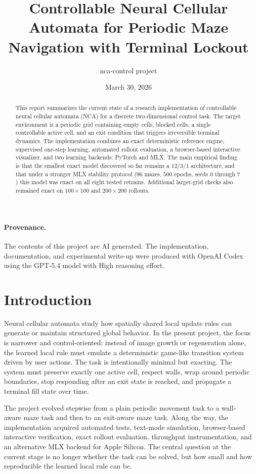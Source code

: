 \documentclass[11pt]{article}
\title{Controllable Neural Cellular Automata for Periodic Maze Navigation with Terminal Lockout}
\author{nca-control project}
\date{March 30, 2026}
\begin{document}
\maketitle

\begin{abstract}
This report summarizes the current state of a research implementation of controllable neural cellular automata (NCA) for a discrete two-dimensional control task. The target environment is a periodic grid containing empty cells, blocked cells, a single controllable active cell, and an exit condition that triggers irreversible terminal dynamics. The implementation combines an exact deterministic reference engine, supervised one-step learning, automated rollout evaluation, a browser-based interactive visualizer, and two learning backends: PyTorch and MLX. The main empirical finding is that the smallest exact model discovered so far remains a \(12/3/1\) architecture, and that under a stronger MLX stability protocol (\(96\) mazes, \(500\) epochs, seeds \(0\) through \(7\)) this model was exact on all eight tested retrains. Additional larger-grid checks also remained exact on \(100\times 100\) and \(200\times 200\) rollouts.
\end{abstract}

\paragraph{Provenance.}
The contents of this project are AI generated. The implementation, documentation, and experimental write-up were produced with OpenAI Codex using the GPT-5.4 model with High reasoning effort.

\section{Introduction}
Neural cellular automata study how spatially shared local update rules can generate or maintain structured global behavior. In the present project, the focus is narrower and control-oriented: instead of image growth or regeneration alone, the learned local rule must emulate a deterministic game-like transition system driven by user actions. The task is intentionally minimal but exacting. The system must preserve exactly one active cell, respect walls, wrap around periodic boundaries, stop responding after an exit state is reached, and propagate a terminal fill state over time.

The project evolved stepwise from a plain periodic movement task to a wall-aware maze task and then to an exit-aware maze task. Along the way, the implementation acquired automated tests, text-mode simulation, browser-based interactive verification, exact rollout evaluation, throughput instrumentation, and an alternative MLX backend for Apple Silicon. The central question at the current stage is no longer whether the task can be solved, but how small and how reproducible the learned local rule can be.
\end{document}
